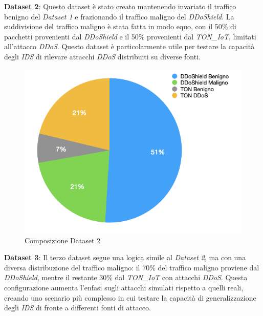 \textbf{Dataset 2}: Questo dataset è stato creato mantenendo invariato il traffico benigno del \textit{Dataset 1} e frazionando il traffico maligno del \textit{DDoShield}. La suddivisione del traffico maligno è stata fatta in modo equo, con il 50\% di pacchetti provenienti dal \textit{DDoShield} e il 50\% provenienti dal \textit{TON\_IoT}, limitati all'attacco \textit{DDoS}. Questo dataset è particolarmente utile per testare la capacità degli \textit{IDS} di rilevare attacchi \textit{DDoS} distribuiti su diverse fonti.

\begin{figure}[htbp]
\centering
\includegraphics[scale= 0.8]{UNINA_MSc_Thesis_Project/img/chapterRisulati/composizione_DATASET_2.png}
  \caption{Composizione Dataset 2}
\end{figure}

\textbf{Dataset 3}: Il terzo dataset segue una logica simile al \textit{Dataset 2}, ma con una diversa distribuzione del traffico maligno: il 70\% del traffico maligno proviene dal \textit{DDoShield}, mentre il restante 30\% dal \textit{TON\_IoT} con attacchi \textit{DDoS}. Questa configurazione aumenta l'enfasi sugli attacchi simulati rispetto a quelli reali, creando uno scenario più complesso in cui testare la capacità di generalizzazione degli \textit{IDS} di fronte a differenti fonti di attacco.

